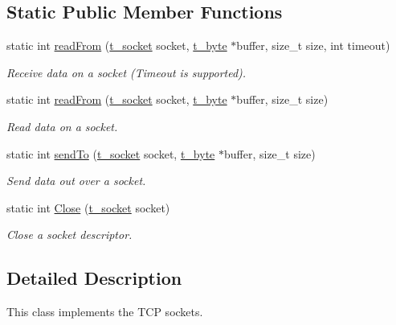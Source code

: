 \subsection*{Static Public Member Functions}
\begin{DoxyCompactItemize}
\item 
static int \hyperlink{classSocket_a880473a820b824bae9cf1f718a2e0ba3}{read\+From} (\hyperlink{util_8h_a3a5c9c6e94e7c0d53da206ce360ea0f2}{t\+\_\+socket} socket, \hyperlink{util_8h_af1d862c52e0c84cc223f106956ac8543}{t\+\_\+byte} $\ast$buffer, size\+\_\+t size, int timeout)
\begin{DoxyCompactList}\small\item\em Receive data on a socket (Timeout is supported). \end{DoxyCompactList}\item 
static int \hyperlink{classSocket_a63d6fc0dbd69e0752fd4c484028c64da}{read\+From} (\hyperlink{util_8h_a3a5c9c6e94e7c0d53da206ce360ea0f2}{t\+\_\+socket} socket, \hyperlink{util_8h_af1d862c52e0c84cc223f106956ac8543}{t\+\_\+byte} $\ast$buffer, size\+\_\+t size)
\begin{DoxyCompactList}\small\item\em Read data on a socket. \end{DoxyCompactList}\item 
static int \hyperlink{classSocket_ab569a0288b1e56f962b1b9ea1cde89eb}{send\+To} (\hyperlink{util_8h_a3a5c9c6e94e7c0d53da206ce360ea0f2}{t\+\_\+socket} socket, \hyperlink{util_8h_af1d862c52e0c84cc223f106956ac8543}{t\+\_\+byte} $\ast$buffer, size\+\_\+t size)
\begin{DoxyCompactList}\small\item\em Send data out over a socket. \end{DoxyCompactList}\item 
static int \hyperlink{classSocket_a123f1a45f0aa67dbf5d85a2280dc2852}{Close} (\hyperlink{util_8h_a3a5c9c6e94e7c0d53da206ce360ea0f2}{t\+\_\+socket} socket)
\begin{DoxyCompactList}\small\item\em Close a socket descriptor. \end{DoxyCompactList}\end{DoxyCompactItemize}


\subsection{Detailed Description}
This class implements the T\+C\+P sockets. 

